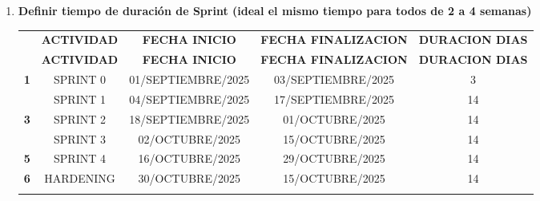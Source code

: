 \begin{doublespace}
\begin{enumerate}[label=\alph*)]
\begin{itemize}
    \end{itemize}
        
    \item \textbf{Definir tiempo de duración de Sprint (ideal el mismo tiempo
    para todos de 2 a 4 semanas)}

       
    \begin{longtable}{|c|c|c|c|c|}
        \hline
        \rowcolor{bleudefrance}
    
        \multicolumn{5}{c|}{\color{aliceblue}\Large\textbf{Definir tiempo de duración de Sprint}}\\
        \hline
        \rowcolor{bleudefrance} \color{aliceblue}{ \textbf{NRO}} & \color{aliceblue}\textbf{ACTIVIDAD} & \color{aliceblue}\textbf{FECHA INICIO} & \color{aliceblue}\textbf{FECHA FINALIZACION} & \color{aliceblue}\textbf{DURACION DIAS}\\
        \hline
        \endfirsthead
        
        \rowcolor{bleudefrance}
        \hline 
        \rowcolor{bleudefrance} \color{aliceblue}{ \textbf{NRO}} & \color{aliceblue}\textbf{ACTIVIDAD} & \color{aliceblue}\textbf{FECHA INICIO} & \color{aliceblue}\textbf{FECHA FINALIZACION} & \color{aliceblue}\textbf{DURACION DIAS}\\
        \hline
        \endhead

        {\textbf{1}} & SPRINT 0 & 01/SEPTIEMBRE/2025 & 03/SEPTIEMBRE/2025 & 3 \\
        \hline
        \rowcolor{lightblue}{\textbf{2}} & SPRINT 1 & 04/SEPTIEMBRE/2025 & 17/SEPTIEMBRE/2025 & 14 \\
        \hline
        {\textbf{3}} & SPRINT 2 & 18/SEPTIEMBRE/2025 & 01/OCTUBRE/2025 & 14 \\
        \hline
        \rowcolor{lightblue}{\textbf{4}} & SPRINT 3 & 02/OCTUBRE/2025 & 15/OCTUBRE/2025 & 14 \\
        \hline
        {\textbf{5}} & SPRINT 4 & 16/OCTUBRE/2025 & 29/OCTUBRE/2025 & 14 \\
        \hline
        {\textbf{6}} & HARDENING & 30/OCTUBRE/2025 & 15/OCTUBRE/2025 & 14    \\
        \hline
        \rowcolor{bleudefrance} \multicolumn{5}{c|}{} \\
        \hline
        

\end{longtable}
\end{enumerate}
\end{doublespace}
